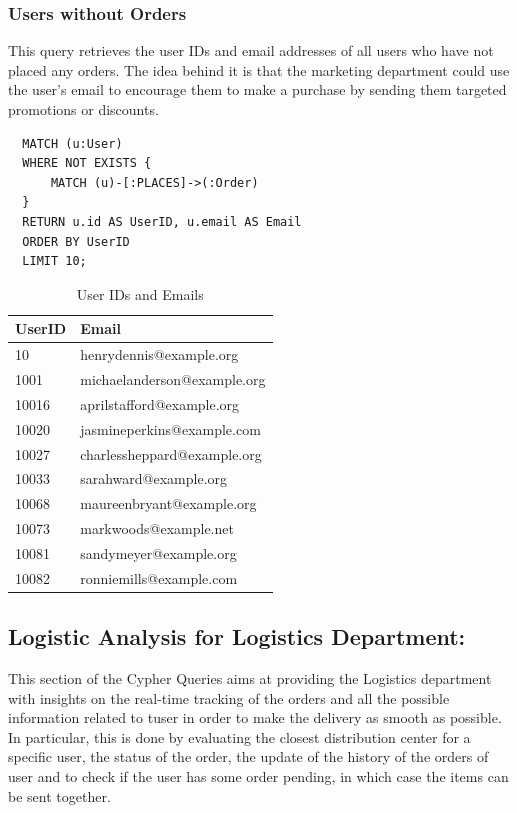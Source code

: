 \documentclass[a4paper,12pt]{article}
\begin{document}
\subsubsection{Users without Orders}
This query retrieves the user IDs and email addresses of all users who have not placed any orders. The idea behind it is that the marketing department could use the user's email to encourage them to make a purchase by sending them targeted promotions or discounts.
\begin{verbatim}
  MATCH (u:User)
  WHERE NOT EXISTS {
      MATCH (u)-[:PLACES]->(:Order)
  }
  RETURN u.id AS UserID, u.email AS Email
  ORDER BY UserID
  LIMIT 10;
\end{verbatim}
\begin{table}[h!]
  \centering
  \caption{User IDs and Emails}
  \label{tab:user_ids_emails}
  \begin{tabular}{l l}
      \toprule
      \textbf{UserID} & \textbf{Email} \\
      \midrule
      10     & henrydennis@example.org       \\
      1001   & michaelanderson@example.org   \\
      10016  & aprilstafford@example.org     \\
      10020  & jasmineperkins@example.com    \\
      10027  & charlessheppard@example.org   \\
      10033  & sarahward@example.org         \\
      10068  & maureenbryant@example.org     \\
      10073  & markwoods@example.net         \\
      10081  & sandymeyer@example.org        \\
      10082  & ronniemills@example.com       \\
      \bottomrule
  \end{tabular}
\end{table}


\subsection{Logistic Analysis for Logistics Department:}
This section of the Cypher Queries aims at providing the Logistics department with insights on the real-time tracking of the orders and all the possible information related to tuser in order to make the delivery as smooth as possible.
In particular, this is done by evaluating the closest distribution center for a specific user, the status of the order, the update of the history of the orders of user and to check if the user has some order pending, in which case the items can be sent together. 
\end{document}
